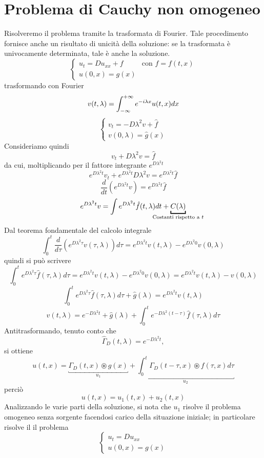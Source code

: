 \section{Problema di Cauchy non omogeneo}
Risolveremo il problema tramite la trasformata di Fourier.
Tale procedimento fornisce anche un risultato di unicit\`a della soluzione:
se la trasformata \`e univocamente determinata, tale \`e anche la soluzione.
\[
	\left\{
	\begin{array}{ll}
		u_t= Du_{xx}+ f & \text{con } f= f(t,x)\\
		u(0,x)= g(x)
	\end{array}
	\right.
\]
trasformando con Fourier
\[
	v(t,\lambda)= \int_{- \infty}^{+ \infty} e^{-i\lambda x} u(t,x) dx
\]
\[
	\left\{
	\begin{array}{l}
		v_t= -D\lambda^2 v+ \hat{f} \\
		v(0,\lambda)= \hat{g}(x)
	\end{array}
	\right.
\]
Consideriamo quindi
\[
	v_t + D \lambda^2 v =\hat{f}
\]
da cui, moltiplicando per il fattore integrante $e^{D\lambda^2 t}$
\[
	e^{D\lambda^2 t} v_t + e^{D\lambda^2 t} D \lambda^2 v 
	=e^{D\lambda^2 t} \hat{f}
\]
\[
	\frac{d}{dt}\left(
	e^{D\lambda^2 t} v \right)
	= e^{D\lambda^2 t} \hat{f}
\]
\[
	e^{D\lambda^2 t} v
	= \int e^{D\lambda^2 t} \hat{f}(t, \lambda) dt 
	+\underbracket{C(\lambda)}_{\mathclap{\text{Costanti rispetto a } t}}
\]
Dal teorema fondamentale del calcolo integrale
\[
	\int_0^t \frac{d}{d\tau}\left(
	e^{D\lambda^2 \tau} v(\tau, \lambda) \right) d\tau=
	e^{D\lambda^2 t} v(t, \lambda) - e^{D\lambda^2 0} v(0,\lambda)
\]
quindi si pu\`o scrivere
\[
	\int_0^t e^{D\lambda^2 \tau} \hat{f}(\tau, \lambda) d\tau
	= e^{D\lambda^2 t} v(t, \lambda) - e^{D\lambda^2 0} v(0,\lambda)
	= e^{D\lambda^2 t} v(t, \lambda) - v(0,\lambda)
\]
\[
	\int_0^t e^{D\lambda^2 \tau} \hat{f}(\tau, \lambda) d\tau 
	+\hat{g}(\lambda)
	= e^{D\lambda^2 t} v(t, \lambda)
\]
\[
	v(t,\lambda)= e^{-D\lambda^2 t} +\hat{g}(\lambda) 
	+ \int_0^t e^{-D\lambda^2 (t - \tau)} \hat{f}(\tau, \lambda) d\tau 
\]
Antitrasformando, tenuto conto che
\[
	\hat{\Gamma}_D(t,\lambda)= e^{-D\lambda^2 t},
\]
si ottiene
\[
	u(t,x)= \underbracket{\Gamma_D(t,x)\circledast g(x)}_{u_1}+
	\underbracket{\int_0^t \Gamma_D(t-\tau, x) 
	\circledast f(\tau, x) d\tau}_{u_2}
\]
perci\`o
\[
	u(t,x)= u_1(t,x)+ u_2(t,x)
\]
Analizzando le varie parti della soluzione, si nota che $u_1$ risolve
il problema omogeneo senza sorgente facendosi carico della situazione 
iniziale; in particolare risolve il il problema
\[
	\left\{ 
	\begin{array}{l}
		u_t=Du_{xx} \\
		u(0,x)= g(x)
	\end{array}
	\right.
\]
